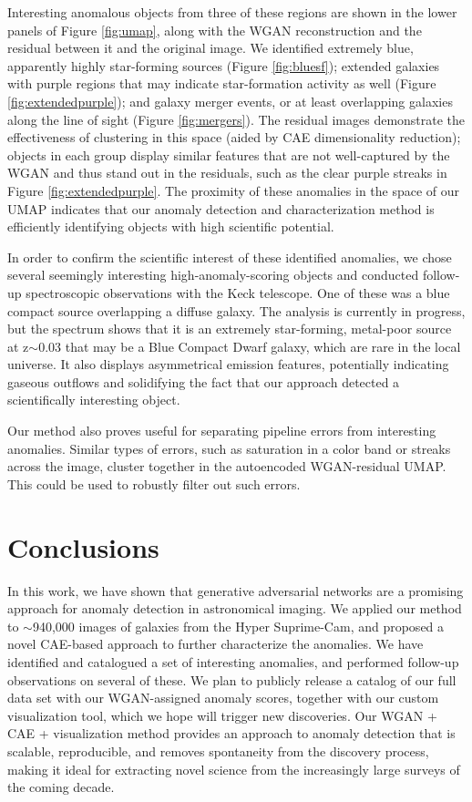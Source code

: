 \documentclass{article}
\begin{document}
Interesting anomalous objects from three of these regions are shown in the lower panels of Figure \ref{fig:umap}, along with the WGAN reconstruction and the residual between it and the original image.
We identified extremely blue, apparently highly star-forming sources (Figure \ref{fig:bluesf}); extended galaxies with purple regions that may indicate star-formation activity as well (Figure \ref{fig:extendedpurple}); and galaxy merger events, or at least overlapping galaxies along the line of sight (Figure \ref{fig:mergers}).
The residual images demonstrate the effectiveness of clustering in this space (aided by CAE dimensionality reduction); objects in each group display similar features that are not well-captured by the WGAN and thus stand out in the residuals, such as the clear purple streaks in Figure \ref{fig:extendedpurple}.
The proximity of these anomalies in the space of our UMAP indicates that our anomaly detection and characterization method is efficiently identifying objects with high scientific potential.

In order to confirm the scientific interest of these identified anomalies, we chose several seemingly interesting high-anomaly-scoring objects and conducted follow-up spectroscopic observations with the Keck telescope. 
One of these was a blue compact source overlapping a diffuse galaxy.
The analysis is currently in progress, but the spectrum shows that it is an extremely star-forming, metal-poor source at z$\sim$0.03 that may be a Blue Compact Dwarf galaxy, which are rare in the local universe.
It also displays asymmetrical emission features, potentially indicating gaseous outflows and solidifying the fact that our approach detected a scientifically interesting object.

Our method also proves useful for separating pipeline errors from interesting anomalies.
Similar types of errors, such as saturation in a color band or streaks across the image, cluster together in the autoencoded WGAN-residual UMAP.
This could be used to robustly filter out such errors.

\section{Conclusions}

In this work, we have shown that generative adversarial networks are a promising approach for anomaly detection in astronomical imaging.
We applied our method to $\sim$940,000 images of galaxies from the Hyper Suprime-Cam, and proposed a novel CAE-based approach to further characterize the anomalies.
We have identified and catalogued a set of interesting anomalies, and performed follow-up observations on several of these.
We plan to publicly release a catalog of our full data set with our WGAN-assigned anomaly scores, together with our custom visualization tool, which we hope will trigger new discoveries. 
Our WGAN + CAE + visualization method provides an approach to anomaly detection that is scalable, reproducible, and removes spontaneity from the discovery process, making it ideal for extracting novel science from the increasingly large surveys of the coming decade.
\end{document}
